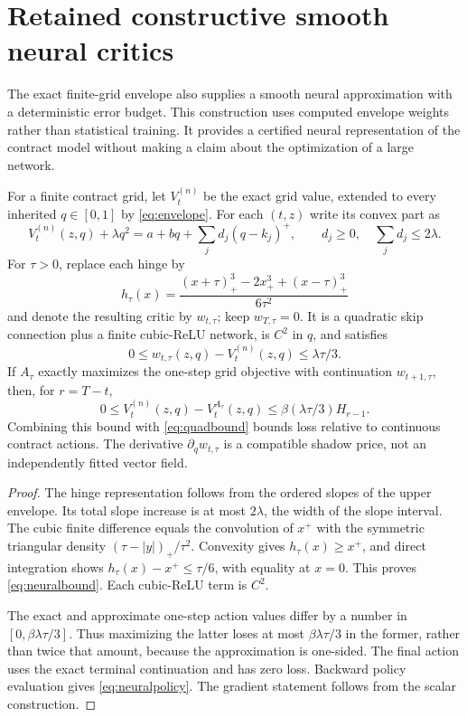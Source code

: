 \section{Retained constructive smooth neural critics}

The exact finite-grid envelope also supplies a smooth neural approximation with a deterministic error budget. This construction uses computed envelope weights rather than statistical training. It provides a certified neural representation of the contract model without making a claim about the optimization of a large network.

\begin{corollary}\label{cor:neural}
For a finite contract grid, let $V_t^{(n)}$ be the exact grid value, extended to every inherited $q\in[0,1]$ by \eqref{eq:envelope}. For each $(t,z)$ write its convex part as
\[
 V_t^{(n)}(z,q)+\lambda q^2=a+bq+\sum_j d_j(q-k_j)^+,
 \qquad d_j\geq0,\quad \sum_jd_j\leq2\lambda.
\]
For $\tau>0$, replace each hinge by
\[
 h_\tau(x)=\frac{(x+\tau)_+^3-2x_+^3+(x-\tau)_+^3}{6\tau^2}
\]
and denote the resulting critic by $w_{t,\tau}$; keep $w_{T,\tau}=0$. It is a quadratic skip connection plus a finite cubic-ReLU network, is $C^2$ in $q$, and satisfies
\begin{equation}\label{eq:neuralbound}
 0\leq w_{t,\tau}(z,q)-V_t^{(n)}(z,q)\leq\lambda\tau/3.
\end{equation}
If $A_\tau$ exactly maximizes the one-step grid objective with continuation $w_{t+1,\tau}$, then, for $r=T-t$,
\begin{equation}\label{eq:neuralpolicy}
 0\leq V_t^{(n)}(z,q)-V_t^{A_\tau}(z,q)
 \leq\beta(\lambda\tau/3)H_{r-1}.
\end{equation}
Combining this bound with \eqref{eq:quadbound} bounds loss relative to continuous contract actions. The derivative $\partial_qw_{t,\tau}$ is a compatible shadow price, not an independently fitted vector field.
\end{corollary}
\begin{proof}
The hinge representation follows from the ordered slopes of the upper envelope. Its total slope increase is at most $2\lambda$, the width of the slope interval. The cubic finite difference equals the convolution of $x^+$ with the symmetric triangular density $(\tau-|y|)_+/\tau^2$. Convexity gives $h_\tau(x)\geq x^+$, and direct integration shows $h_\tau(x)-x^+\leq\tau/6$, with equality at $x=0$. This proves \eqref{eq:neuralbound}. Each cubic-ReLU term is $C^2$.

The exact and approximate one-step action values differ by a number in $[0,\beta\lambda\tau/3]$. Thus maximizing the latter loses at most $\beta\lambda\tau/3$ in the former, rather than twice that amount, because the approximation is one-sided. The final action uses the exact terminal continuation and has zero loss. Backward policy evaluation gives \eqref{eq:neuralpolicy}. The gradient statement follows from the scalar construction.\end{proof}


